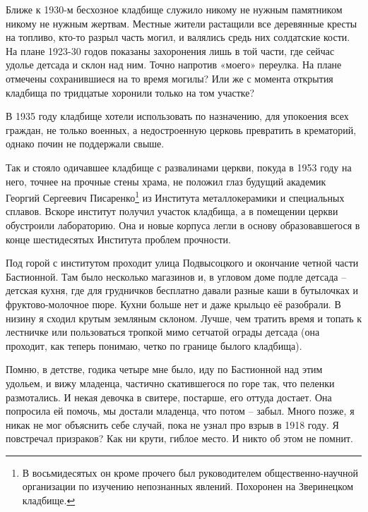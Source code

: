 Ближе к 1930-м бесхозное кладбище служило никому не нужным памятником никому не нужным жертвам. Местные жители растащили все деревянные кресты на топливо, кто-то разрыл часть могил, и валялись средь них солдатские кости. На плане 1923-30 годов показаны захоронения лишь в той части, где сейчас удолье детсада и склон над ним. Точно напротив «моего» переулка. На плане отмечены сохранившиеся на то время могилы? Или же с момента открытия кладбища по тридцатые хоронили только на том участке?



В 1935 году кладбище хотели использовать по назначению, для упокоения всех граждан, не только военных, а недостроенную церковь превратить в крематорий, однако почин не поддержали свыше.

Так и стояло одичавшее кладбище с развалинами церкви, покуда в 1953 году на него, точнее на прочные стены храма, не положил глаз будущий академик Георгий Сергеевич Писаренко\footnote{В восьмидесятых он кроме прочего был руководителем общественно-научной организации по изучению непознанных явлений. Похоронен на Зверинецком кладбище.} из Института металлокерамики и специальных сплавов. Вскоре институт получил участок кладбища, а в помещении церкви обустроили лабораторию. Она и новые корпуса легли в основу образовавшегося в конце шестидесятых Института проблем прочности.

Под горой с институтом проходит улица Подвысоцкого и окончание четной части Бастионной. Там было несколько магазинов и, в угловом доме подле детсада – детская кухня, где для грудничков бесплатно давали разные каши в бутылочках и фруктово-молочное пюре. Кухни больше нет и даже крыльцо её разобрали. В низину я сходил крутым земляным склоном. Лучше, чем тратить время и топать к лестничке или пользоваться тропкой мимо сетчатой ограды детсада (она проходит, как теперь понимаю, четко по границе былого кладбища).

Помню, в детстве, годика четыре мне было, иду по Бастионной над этим удольем, и вижу младенца, частично скатившегося по горе так, что пеленки размотались. И некая девочка в свитере, постарше, его оттуда достает. Она попросила ей помочь, мы достали младенца, что потом – забыл. Много позже, я никак не мог объяснить себе случай, пока не узнал про взрыв в 1918 году. Я повстречал призраков? Как ни крути, гиблое место. И никто об этом не помнит.

